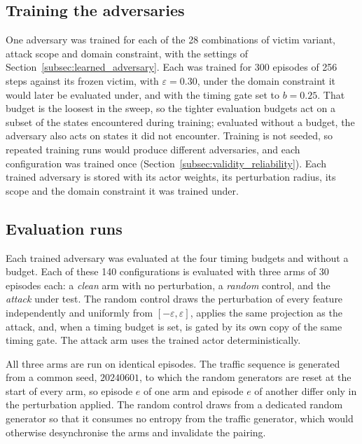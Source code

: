 \subsection{Training the adversaries}
\label{subsec:procedure_training}

One adversary was trained for each of the 28 combinations of victim variant, attack
scope and domain constraint, with the settings of Section~\ref{subsec:learned_adversary}.
Each was trained for 300 episodes of 256 steps against its frozen victim, with
$\varepsilon = 0.30$, under the domain constraint it would later be evaluated under,
and with the timing gate set to $b = 0.25$. That budget is the loosest in the sweep, so
the tighter evaluation budgets act on a subset of the states encountered during
training; evaluated without a budget, the adversary also acts on states it did not
encounter. Training is not seeded, so repeated training runs would produce different
adversaries, and each configuration was trained once
(Section~\ref{subsec:validity_reliability}).
Each trained adversary is stored with its actor weights, its perturbation radius, its
scope and the domain constraint it was trained under.

\subsection{Evaluation runs}
\label{subsec:procedure_evaluation}

Each trained adversary was evaluated at the four timing budgets and without a budget.
Each of these 140 configurations is evaluated with three arms of 30 episodes each: a
\emph{clean} arm with no perturbation, a \emph{random} control, and the \emph{attack}
under test. The random control draws the perturbation of every feature independently
and uniformly from $[-\varepsilon, \varepsilon]$, applies the same projection as the
attack, and, when a timing budget is set, is gated by its own copy of the same timing
gate. The attack arm uses the trained actor deterministically.

All three arms are run on identical episodes. The traffic sequence is generated from a
common seed, $20240601$, to which the random generators are reset at the start of every
arm, so episode $e$ of one arm and episode $e$ of another differ only in the
perturbation applied. The random control draws from a dedicated random generator so
that it consumes no entropy from the traffic generator, which would otherwise
desynchronise the arms and invalidate the pairing.

